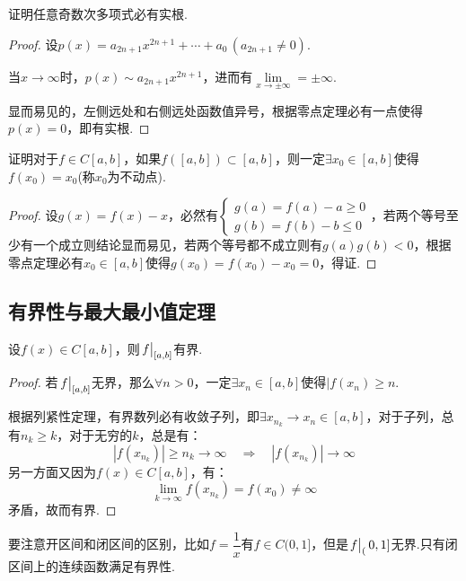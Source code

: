 \begin{question}
    证明任意奇数次多项式必有实根.
\end{question}

\begin{proof}
    设$p(x)=a_{2n+1}x^{2n+1}+\cdots+a_0\,(a_{2n+1}\neq 0)$.

    当$x\to\infty$时，$p(x)\sim a_{2n+1}x^{2n+1}$，进而有$\lim\limits_{x\to\pm\infty}=\pm\infty$.

    显而易见的，左侧远处和右侧远处函数值异号，根据零点定理必有一点使得$p(x)=0$，即有实根.
\end{proof}

\begin{question}
    证明对于$f \in C[a,b]$，如果$f([a,b])\subset[a,b]$，则一定$\exists x_0 \in [a,b]$使得$f(x_0)=x_0$(称$x_0$为不动点).
\end{question}

\begin{proof}
    设$g(x)=f(x)-x$，必然有$\begin{cases}
        g(a)=f(a)-a\geqslant 0\\
        g(b)=f(b)-b\leqslant 0
    \end{cases}$，若两个等号至少有一个成立则结论显而易见，若两个等号都不成立则有$g(a)g(b)<0$，根据零点定理必有$x_0 \in [a,b]$使得$g(x_0)=f(x_0)-x_0=0$，得证.
\end{proof}


\subsection{有界性与最大最小值定理}
\begin{theorem}
    设$f(x)\in C[a,b]$，则$\eval{f}_{[a,b]}$有界.
\end{theorem}

\begin{proof}
    若$\eval{f}_{[a,b]}$无界，那么$\forall n>0$，一定$\exists x_n \in [a,b]$使得$|f(x_n)\geqslant n$.

    根据列紧性定理，有界数列必有收敛子列，即$\exists x_{n_k} \to x_n \in [a,b]$，对于子列，总有$n_k \geqslant k$，对于无穷的$k$，总是有：
    \[|f(x_{n_k})|\geqslant n_k \to \infty \quad\Rightarrow\quad |f(x_{n_k})|\to\infty\]
    另一方面又因为$f(x)\in C[a,b]$，有：
    \[\lim_{k\to\infty}f(x_{n_k}) = f(x_0) \neq \infty\]
    矛盾，故而有界.
\end{proof}

要注意开区间和闭区间的区别，比如$f=\dfrac{1}{x}$有$f \in C(0,1]$，但是$\eval{f}_(0,1]$无界.只有闭区间上的连续函数满足有界性.


